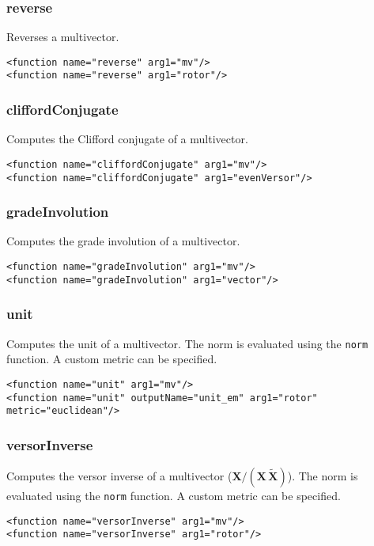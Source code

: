 \documentclass[10pt, a4paper]{article}
\newcommand{\gav}[1]{\ensuremath{\mathbf{#1}}}
\newcommand{\gp}{\,}
\newcommand{\rev}[1]{\widetilde{#1}}
\begin{document}
\subsubsection*{reverse}

Reverses a multivector.
\begin{verbatim}
<function name="reverse" arg1="mv"/>
<function name="reverse" arg1="rotor"/>
\end{verbatim}

\subsubsection*{cliffordConjugate}

Computes the Clifford conjugate of a multivector.
\begin{verbatim}
<function name="cliffordConjugate" arg1="mv"/>
<function name="cliffordConjugate" arg1="evenVersor"/>
\end{verbatim}

\subsubsection*{gradeInvolution}

Computes the grade involution of a multivector.
\begin{verbatim}
<function name="gradeInvolution" arg1="mv"/>
<function name="gradeInvolution" arg1="vector"/>
\end{verbatim}

\subsubsection*{unit}

Computes the unit of a multivector. The norm is evaluated using
the {\tt norm} function. A custom metric can be specified.
\begin{verbatim}
<function name="unit" arg1="mv"/>
<function name="unit" outputName="unit_em" arg1="rotor" metric="euclidean"/>
\end{verbatim}

\subsubsection*{versorInverse}

Computes the versor inverse of a multivector ($\gav{X} / (\gav{X} \gp \rev{\gav{X}})$). 
The norm is evaluated using the {\tt norm} function. A custom metric can be specified.
\begin{verbatim}
<function name="versorInverse" arg1="mv"/>
<function name="versorInverse" arg1="rotor"/>
\end{verbatim}
\end{document}
